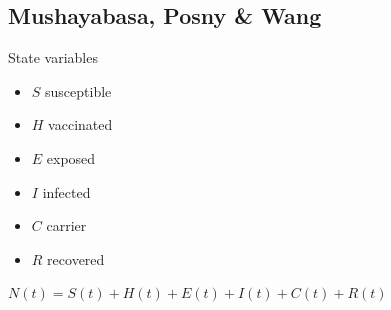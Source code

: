 \documentclass[aspectratio=43]{beamer}
\begin{document}

\subsection{Mushayabasa, Posny \& Wang}

\begin{frame}{State variables}
  \begin{itemize}
    \item $S$ susceptible
    \item $H$ vaccinated
    \item $E$ exposed
    \item $I$ infected
    \item $C$ carrier 
    \item $R$ recovered
  \end{itemize}
  \vfill
  $N(t)=S(t)+H(t)+E(t)+I(t)+C(t)+R(t)$
\end{frame}
\end{document}
